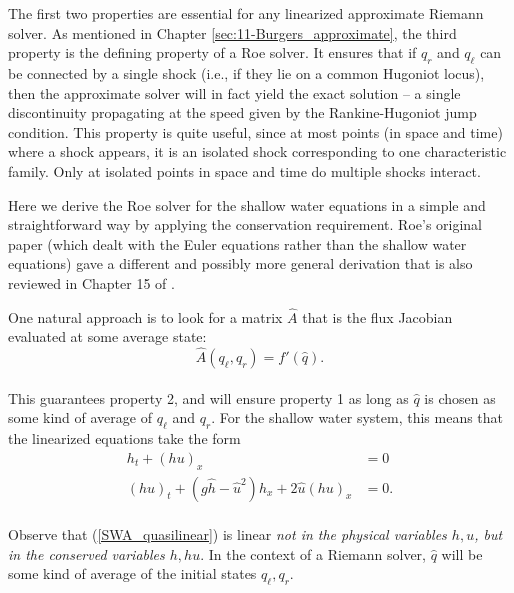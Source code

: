 \documentclass{SIAMbook2016}
\begin{document}
The first two properties are essential for any linearized approximate
Riemann solver. As mentioned in
Chapter \ref{sec:11-Burgers_approximate}, the third property is the
defining property of a Roe solver. It ensures that if \(q_r\) and
\(q_\ell\) can be connected by a single shock (i.e., if they lie on a
common Hugoniot locus), then the approximate solver will in fact yield
the exact solution -- a single discontinuity propagating at the speed
given by the Rankine-Hugoniot jump condition. This property is quite
useful, since at most points (in space and time) where a shock appears,
it is an isolated shock corresponding to one characteristic family. Only
at isolated points in space and time do multiple shocks interact.

Here we derive the Roe solver for the shallow water equations in a
simple and straightforward way by applying the conservation requirement.
Roe's original paper \cite{Roe1981} (which dealt with the
Euler equations rather than the shallow water equations) gave a
different and possibly more general derivation that is also reviewed in
Chapter 15 of \cite{fvmhp}.

One natural approach is to look for a matrix \(\hat{A}\) that is the
flux Jacobian evaluated at some average state:\\
\[\hat{A}(q_\ell,q_r) = f'(\hat{q}).\]\\
This guarantees property 2, and will ensure property 1 as long as
\(\hat{q}\) is chosen as some kind of average of \(q_\ell\) and \(q_r\).
For the shallow water system, this means that the linearized equations
take the form\\
\begin{align} \label{SWA_quasilinear}
h_t + (hu)_x & = 0 \\
(hu)_t + (g\hat{h}-\hat{u}^2)h_x + 2\hat{u}(hu)_x & = 0. \nonumber
\end{align}\\
Observe that (\ref{SWA_quasilinear}) is linear \emph{not in the physical
variables \(h, u\), but in the conserved variables \(h, hu\)}. In the
context of a Riemann solver, \(\hat{q}\) will be some kind of average of
the initial states \(q_\ell, q_r\).
\end{document}
